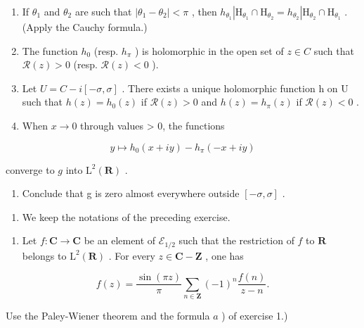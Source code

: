 \begin{enumerate}
\def\labelenumi{\alph{enumi})}
\setcounter{enumi}{2}
\item
  If \(\theta_{1}\) and \(\theta_{2}\) are such that \(|\theta_{1} - \theta_{2}| < \pi\) , then \(h_{\theta_1}|\mathrm{H}_{\theta_1} \cap \mathrm{H}_{\theta_2} = h_{\theta_2}|\mathrm{H}_{\theta_2} \cap \mathrm{H}_{\theta_1}\) . (Apply the Cauchy formula.)
\item
  The function \(h_{0}\) (resp. \(h_{\pi}\) ) is holomorphic in the open set of \(z \in C\) such that \(\mathcal{R}(z) > 0\) (resp. \(\mathcal{R}(z) < 0\) ).
\item
  Let \(U = C - i[-\sigma, \sigma]\) . There exists a unique holomorphic function h on U such that \(h(z) = h_{0}(z)\) if \(\mathcal{R}(z) > 0\) and \(h(z) = h_{\pi}(z)\) if \(\mathcal{R}(z) < 0\) .
\item
  When \(x \rightarrow 0\) through values \textgreater{} 0, the functions
\end{enumerate}

\[
y \mapsto h _ {0} (x + i y) - h _ {\pi} (- x + i y)
\]

converge to \(g\) into \(\mathrm{L}^2 (\mathbf{R})\) .

\begin{enumerate}
\def\labelenumi{\alph{enumi})}
\setcounter{enumi}{6}
\tightlist
\item
  Conclude that g is zero almost everywhere outside \([-\sigma, \sigma]\) .
\end{enumerate}

\begin{enumerate}
\def\labelenumi{\arabic{enumi})}
\setcounter{enumi}{36}
\tightlist
\item
  We keep the notations of the preceding exercise.
\end{enumerate}

\begin{enumerate}
\def\labelenumi{\alph{enumi})}
\tightlist
\item
  Let \(f\colon\mathbf{C}\to\mathbf{C}\) be an element of \(\mathcal{E}_{1/2}\) such that the restriction of \(f\) to \(\mathbf{R}\) belongs to \(\mathrm{L}^{2}(\mathbf{R})\) . For every \(z\in\mathbf{C}-\mathbf{Z}\) , one has
\end{enumerate}

\[
f (z) = \frac {\sin (\pi z)}{\pi} \sum_ {n \in \mathbf {Z}} (- 1) ^ {n} \frac {f (n)}{z - n}.
\]

Use the Paley-Wiener theorem and the formula \(a\) ) of exercise 1.)

